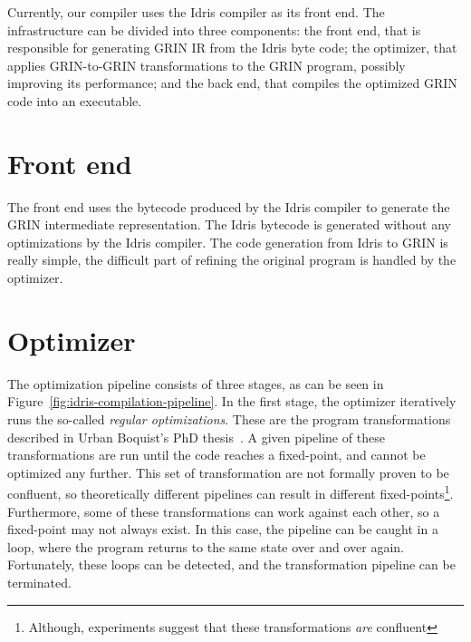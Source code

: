 \documentclass[main.tex]{subfiles}
\begin{document}
	
	Currently, our compiler uses the Idris compiler as its front end. The infrastructure can be divided into three components: the front end, that is responsible for generating GRIN IR from the Idris byte code; the optimizer, that applies GRIN-to-GRIN transformations to the GRIN program, possibly improving its performance; and the back end, that compiles the optimized GRIN code into an executable.
	
	\section{Front end}
	\label{sec:idris-front-end}
	
	The front end uses the bytecode produced by the Idris compiler to generate the GRIN intermediate representation. The Idris bytecode is generated without any optimizations by the Idris compiler. The code generation from Idris to GRIN is really simple, the difficult part of refining the original program is handled by the optimizer. 
	
	\section{Optimizer}
	\label{sec:idris-optimizer}
	
	The optimization pipeline consists of three stages, as can be seen in Figure~\ref{fig:idris-compilation-pipeline}. In the first stage, the optimizer iteratively runs the so-called \textit{regular optimizations}. These are the program transformations described in Urban Boquist's PhD thesis~\cite{boquist-phd}. A given pipeline of these transformations are run until the code reaches a fixed-point, and cannot be optimized any further. This set of transformation are not formally proven to be confluent, so theoretically different pipelines can result in different fixed-points\footnote{Although, experiments suggest that these transformations \textit{are} confluent}. Furthermore, some of these transformations can work against each other, so a fixed-point may not always exist. In this case, the pipeline can be caught in a loop, where the program returns to the same state over and over again. Fortunately, these loops can be detected, and the transformation pipeline can be terminated. 
	
	\begin{figure}[t] 
		\centering
		
	\end{figure}
	
\end{document}
